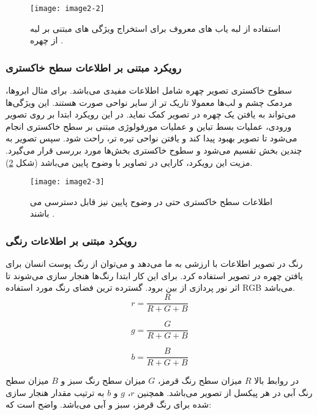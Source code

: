 \begin{figure}[h]
\centering
  \texttt{[image: image2-2]}
  \caption{استفاده از لبه یاب های معروف برای استخراج ویژگی های مبتنی بر لبه از چهره  \cite{HJELMAS2001236}.}
  \label{image2-2}
\end{figure}

\subsubsection{رویکرد مبتنی بر اطلاعات سطح خاکستری} 
سطوح خاکستری  تصویر چهره شامل اطلاعات مفیدی می‌باشد. برای مثال ابرو‌ها، مردمک چشم و لب‌ها معمولا تاریک تر از سایر نواحی صورت هستند. این ویژگی‌ها می‌تواند به یافتن یک چهره در تصویر کمک نماید. در این رویکرد ابتدا بر روی تصویر ورودی، عملیات بسط تباین  و عملیات مورفولوژی  مبتنی بر سطح خاکستری انجام می‌شود تا تصویر بهبود پیدا کند و یافتن نواحی تیره تر، راحت شود. سپس تصویر به چندین بخش تقسیم می‌شود و سطوح خاکستری بخش‌ها مورد بررسی قرار می‌گیرد. مزیت این رویکرد، کارایی در تصاویر با وضوح پایین می‌باشد (شکل \ref{image2-3}).

\begin{figure}[h]
\centering
  \texttt{[image: image2-3]}
  \caption{اطلاعات سطح خاکستری حتی در وضوح پایین نیز قابل دسترسی می باشند  \cite{HJELMAS2001236}.}
  \label{image2-3}
\end{figure}

\subsubsection{رویکرد مبتنی بر اطلاعات رنگی}
رنگ در تصویر اطلاعات با ارزشی به ما می‌دهد و می‌توان از رنگ پوست انسان برای یافتن چهره در تصویر استفاده کرد. برای این کار ابتدا رنگ‌ها هنجار سازی  می‌شوند تا اثر نور پردازی از بین برود. گسترده ترین فضای رنگ مورد استفاده RGB می‌باشد.
\begin{equation}\label{eq2-1}
r = \frac{R}{R + G + B}
\end{equation}

\begin{equation}\label{eq2-2}
g = \frac{G}{R + G + B}
\end{equation}

\begin{equation}\label{eq2-3}
b = \frac{B}{R + G + B}
\end{equation}

در روابط بالا $R$ میزان سطح رنگ قرمز، $G$ میزان سطح رنگ سبز و $B$ میزان سطح رنگ آبی در هر پیکسل از تصویر می‌باشد. همچنین $r$، $g$ و $b$ به ترتیب مقدار هنجار سازی شده برای رنگ قرمز، سبز و آبی می‌باشد. واضح است که:

